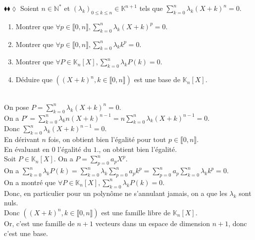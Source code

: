 \documentclass[11pt]{article}
\newcommand*{\K}{\mathbb{K}}
\newcommand*{\N}{\mathbb{N}}
\begin{document}
\begin{exercise}{$\blacklozenge\blacklozenge\lozenge$}{}
    Soient $n\in\N^*$ et $(\lambda_k)_{0\leq k\leq n}\in\K^{n+1}$ tels que $\sum_{k=0}^n\lambda_k(X + k)^n=0$.
    \begin{enumerate}[topsep=0pt,itemsep=-0.9 ex]
        \item Montrer que $\forall p \in \llbracket 0, n \rrbracket, \sum_{k=0}^n \lambda_k(X+k)^p=0$.
        \item Montrer que $\forall p \in \llbracket 0, n \rrbracket, \sum_{k=0}^n \lambda_kk^p = 0$.
        \item Montrer que $\forall P \in \K_n[X], \sum_{k=0}^n\lambda_k P(k) = 0$.
        \item Déduire que $\left( (X + k)^n, k \in \llbracket 0, n \rrbracket \right)$ est une base de $\K_n[X]$.
    \end{enumerate}
    \tcblower\\[0.2cm]
    On pose $P = \sum_{k=0}^n \lambda_k(X+k)^n = 0$.\\
     On a $P' = \sum_{k=0}^n \lambda_k n(X+k)^{n-1} = n\sum_{k=0}^n \lambda_k(X+k)^{n-1} = 0$.\\
    Donc $\sum_{k=0}^n \lambda_k(X+k)^{n-1} = 0$.\\
    En dérivant $n$ fois, on obtient bien l'égalité pour tout $p\in\llbracket 0, n\rrbracket$.\\[0.2cm]
     En évaluant en $0$ l'égalité du $\boxed{1.}$, on obtient bien l'égalité.\\[0.2cm]    
     Soit $P\in\K_n[X]$. On a $P = \sum_{p=0}^n a_pX^p$.\\
    On a $\sum_{k=0}^n \lambda_k P(k) = \sum_{k=0}^n \lambda_k \sum_{p=0}^n a_pk^p = \sum_{p=0}^n a_p\sum_{k=0}^n \lambda_kk^p = 0$.\\[0.2cm]
     On a montré que $\forall P\in\K_n[X], \sum_{k=0}^n \lambda_kP(k) = 0$.\\
    Donc, en particulier pour un polynôme ne s'annulant jamais, on a que les $\lambda_k$ sont nuls.\\
    Donc $\left( (X + k)^n, k \in \llbracket 0, n \rrbracket \right)$ est une famille libre de $\K_n[X]$.\\
    Or, c'est une famille de $n+1$ vecteurs dans un espace de dimension $n+1$, donc c'est une base.
\end{exercise}
\end{document}
